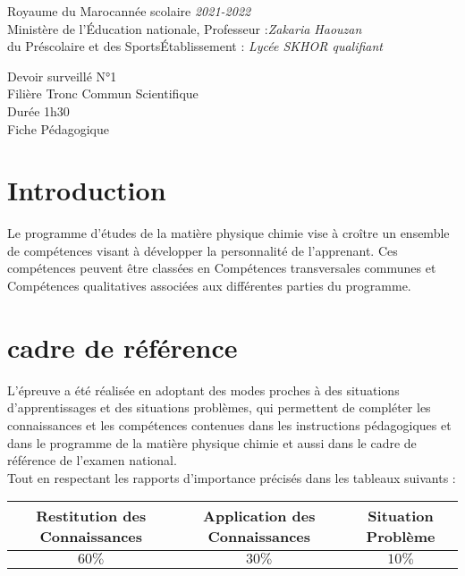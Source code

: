 \documentclass[12pt]{article}
\newcommand\headerMe[2]{\noindent{}#1\hfill#2}
\begin{document}
\headerMe{Royaume du Maroc}{année scolaire \emph{2021-2022}}\\
\headerMe{Ministère de l'Éducation nationale, }{  Professeur :\emph{Zakaria Haouzan}}\\
\headerMe{du Préscolaire et des Sports}{Établissement : \emph{Lycée SKHOR qualifiant}}\\

\begin{center}
Devoir surveillé N°1 \\
 Filière Tronc Commun Scientifique \\
Durée 1h30
\\
    \vspace{.2cm}
\hrulefill
\Large{Fiche Pédagogique}
\hrulefill\\
\end{center}


\section[A]{Introduction }
\hspace{0.5cm}Le programme d'études de la matière physique chimie vise à croître un ensemble de compétences visant à développer la personnalité de l'apprenant. Ces compétences peuvent être classées en Compétences transversales communes et Compétences qualitatives associées aux différentes parties du programme.
\section{cadre de référence }
 \hspace{0.5cm}L'épreuve a été réalisée en adoptant des modes proches à des situations d'apprentissages et des situations problèmes, qui permettent de compléter les connaissances et les compétences contenues dans les instructions pédagogiques et dans le programme de la matière physique chimie et aussi dans le cadre de référence de l'examen national. 
 \\Tout en respectant les rapports d'importance précisés dans les tableaux suivants :
 \begin{center}
\begin{tabular}{|c||c||c|}
\hline
    \textbf{Restitution des Connaissances} & \textbf{Application des Connaissances} & \textbf{Situation Problème }\\
    \hline
    $60\%$ & $30\%$ & $10\%$\\
    \hline
\end{tabular} 
\end{center}
\end{document}
